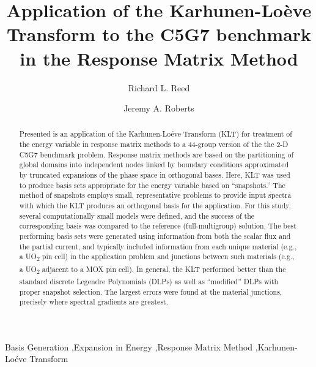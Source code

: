\documentclass[5p,times,twocolumn,10pt]{elsarticle}
\begin{document}
 
\begin{frontmatter}


\title{Application of the Karhunen-Lo\`{e}ve Transform to the C5G7 benchmark in 
the Response Matrix Method}

\author{Richard L. Reed}
\author{Jeremy A. Roberts}

\address{
Mechanical and Nuclear Engineering, Kansas State University, Manhattan, KS
}


\begin{abstract}
Presented is an application of the Karhunen-Lo\'eve Transform (KLT) for treatment of the energy variable in response matrix methods  to a 44-group version of the the 2-D C5G7 benchmark problem.  Response matrix methods are based on the partitioning of global domains into independent nodes linked by boundary conditions approximated by truncated expansions of the phase space in orthogonal bases.  Here, KLT was used to produce basis sets appropriate for the energy variable based on ``snapshots.''  The method of snapshots employs small, representative problems to provide input spectra with which the KLT produces an orthogonal basis for the application. For this study, several computationally small models were defined, and the success of the corresponding basis was compared to the  reference (full-multigroup) solution.  The best performing basis sets were generated using information from both the scalar flux and the partial current, and typically included information from each unique material (e.g., a UO\textsubscript{2} pin cell) in the application problem and junctions between such materials (e.g., a UO\textsubscript{2} adjacent to a MOX pin cell).  In general, the KLT performed better than the standard discrete Legendre Polynomials (DLPs) as well as ``modified'' DLPs with proper snapshot selection.  The largest errors were found at the material junctions, precisely where spectral gradients are greatest.
\end{abstract}

\begin{keyword}
Basis Generation \sep Expansion in Energy \sep Response Matrix Method \sep Karhunen-Lo\'eve Transform


\end{keyword}

\end{frontmatter}
\end{document}
